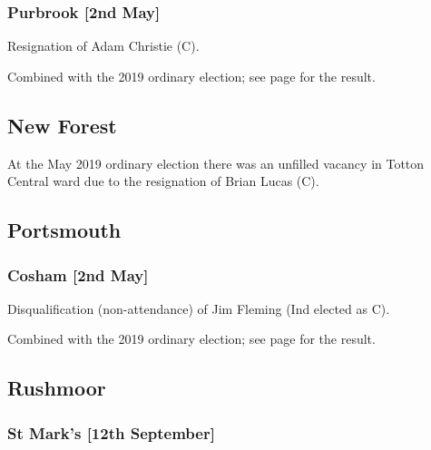 \documentclass[a4paper,openany]{book}
\begin{document}
\begin{resultsiii}
\subsubsection*{Purbrook \hspace*{\fill}\nolinebreak[1]%
	\enspace\hspace*{\fill}
	[2nd May]}


Resignation of Adam Christie (C).

Combined with the 2019 ordinary election; see page \pageref{HavantPurbrook} for the result.

\subsection*{New Forest}

At the May 2019 ordinary election there was an unfilled vacancy in Totton Central ward due to the resignation of Brian Lucas (C).

\subsection*{Portsmouth}

\subsubsection*{Cosham \hspace*{\fill}\nolinebreak[1]%
	\enspace\hspace*{\fill}
	[2nd May]}


Disqualification (non-attendance) of Jim Fleming (Ind elected as C).

Combined with the 2019 ordinary election; see page \pageref{PortsmouthCosham} for the result.

\subsection*{Rushmoor}

\subsubsection*{St Mark's \hspace*{\fill}\nolinebreak[1]%
	\enspace\hspace*{\fill}
	[12th September]}


\end{resultsiii}
\end{document}
